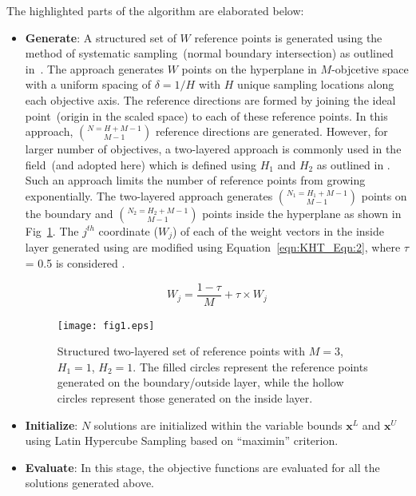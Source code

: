 \documentclass{sig-alternate}
\begin{document}
The highlighted parts of the algorithm are elaborated below:\\
\begin{itemize}
	\item \textbf{Generate}: A structured set of $W$ reference points is generated using the method of systematic sampling~(normal boundary intersection) as outlined in~\cite{KHT_das1998normal}. The approach generates $W$ points on the hyperplane in $M$-objcetive space with a uniform spacing of $\delta=1/H$ with $H$ unique sampling locations along each objective axis. The reference directions are formed by joining the ideal point~(origin in the scaled space) to each of these reference points. In this approach, $N = {H+M-1}\choose{M-1}$ reference directions are generated. However, for larger number of objectives, a two-layered approach is commonly used in the field~(and adopted here) which is defined using $H_1$ and $H_2$ as outlined in \cite{KHT_Li2015dominance}. Such an approach limits the number of reference points from growing exponentially. The two-layered approach generates $N_1 = {H_1+M-1}\choose{M-1}$ points on the boundary and $N_2 = {H_2+M-1}\choose{M-1}$ points inside the hyperplane as shown in Fig~\ref{fig:KHT_Fig:1}. The $j^{th}$ coordinate ($W_j$) of each of the weight vectors in the inside layer generated using \cite{das1998normal} are modified using Equation~\ref{eqn:KHT_Eqn:2}, where $\tau$ = 0.5 is considered \cite{Li2015dominance}.
	
	\begin{equation}
	W_j = \frac{1-\tau}{M} + \tau \times W_j
	\label{eqn:KHT_Eqn:2} 
	\end{equation} 
	
	\begin{figure}[!htb]
		\centering
		\texttt{[image: fig1.eps]}
		\caption{Structured two-layered set of reference points with $M=3$, $H_1=1$, $H_2=1$. The filled circles represent the reference points generated on the boundary/outside layer, while the hollow circles represent those generated on the inside layer.}
		\label{fig:KHT_Fig:1}
	\end{figure}
	
	\item \textbf{Initialize}: $N$ solutions are initialized within the variable bounds $\textbf{x}^{L}$ and $\textbf{x}^{U}$ using Latin Hypercube Sampling based on ``maximin'' criterion.
	
	\item \textbf{Evaluate}: In this stage, the objective functions are evaluated for all the solutions generated above.
	

\end{itemize}
\end{document}
